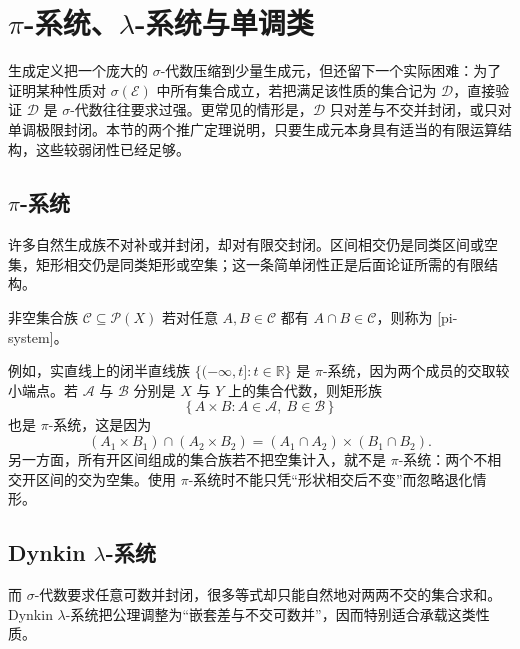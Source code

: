 \section{\texorpdfstring{\(\pi\)}{\AnalysisPdfPi}-系统、\texorpdfstring{\(\lambda\)}{\AnalysisPdfLambda}-系统与单调类}
\label{b1:sec:0103}

生成定义把一个庞大的 \(\sigma\)-代数压缩到少量生成元，但还留下一个实际困难：为了证明某种性质对 \(\sigma(\mathcal E)\) 中所有集合成立，若把满足该性质的集合记为 \(\mathcal D\)，直接验证 \(\mathcal D\) 是 \(\sigma\)-代数往往要求过强。更常见的情形是，\(\mathcal D\) 只对差与不交并封闭，或只对单调极限封闭。本节的两个推广定理说明，只要生成元本身具有适当的有限运算结构，这些较弱闭性已经足够。

\subsection{\texorpdfstring{\(\pi\)}{\AnalysisPdfPi}-系统}
\label{b1:subsec:010301}

许多自然生成族不对补或并封闭，却对有限交封闭。区间相交仍是同类区间或空集，矩形相交仍是同类矩形或空集；这一条简单闭性正是后面论证所需的有限结构。

\begin{definition}
\label{b1:def:pi-system}
非空集合族 \(\mathcal C\subseteq\mathcal P(X)\) 若对任意 \(A,B\in\mathcal C\) 都有 \(A\cap B\in\mathcal C\)，则称为 [pi-system]。
\end{definition}

例如，实直线上的闭半直线族
\(
\{(-\infty,t]:t\in\mathbb R\}
\)
是 \(\pi\)-系统，因为两个成员的交取较小端点。若 \(\mathcal A\) 与 \(\mathcal B\) 分别是 \(X\) 与 \(Y\) 上的集合代数，则矩形族
\[
\{\,A\times B:A\in\mathcal A,\ B\in\mathcal B\,\}
\]
也是 \(\pi\)-系统，这是因为
\[
(A_1\times B_1)\cap(A_2\times B_2)
=(A_1\cap A_2)\times(B_1\cap B_2).
\]
另一方面，所有开区间组成的集合族若不把空集计入，就不是 \(\pi\)-系统：两个不相交开区间的交为空集。使用 \(\pi\)-系统时不能只凭“形状相交后不变”而忽略退化情形。

\subsection{Dynkin \texorpdfstring{\(\lambda\)}{\AnalysisPdfLambda}-系统}
\label{b1:subsec:010302}

而 \(\sigma\)-代数要求任意可数并封闭，很多等式却只能自然地对两两不交的集合求和。Dynkin \(\lambda\)-系统把公理调整为“嵌套差与不交可数并”，因而特别适合承载这类性质。

